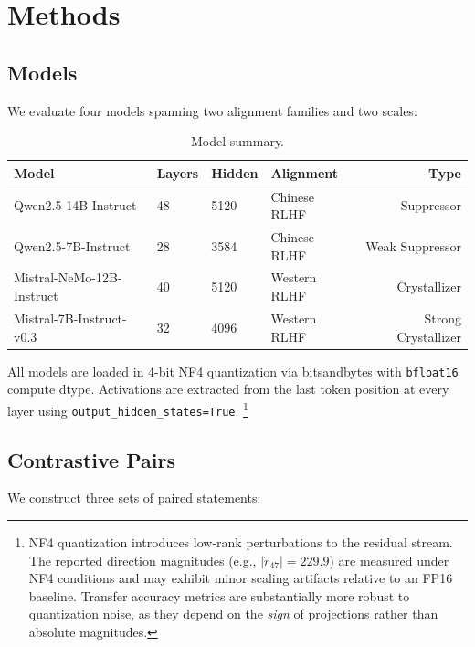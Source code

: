 \documentclass[12pt]{article}
\theoremstyle{definition}
\begin{document}
\section{Methods}
\label{sec:methods}

\subsection{Models}
\label{sec:models}

We evaluate four models spanning two alignment families and two scales:

\begin{table}[h]
\centering
\caption{Model summary.}
\label{tab:models}
\begin{tabular}{llllr}
\toprule
\textbf{Model} & \textbf{Layers} & \textbf{Hidden} & \textbf{Alignment} & \textbf{Type} \\
\midrule
Qwen2.5-14B-Instruct  & 48 & 5120 & Chinese RLHF & Suppressor \\
Qwen2.5-7B-Instruct   & 28 & 3584 & Chinese RLHF & Weak Suppressor \\
Mistral-NeMo-12B-Instruct & 40 & 5120 & Western RLHF & Crystallizer \\
Mistral-7B-Instruct-v0.3  & 32 & 4096 & Western RLHF & Strong Crystallizer \\
\bottomrule
\end{tabular}
\end{table}

All models are loaded in 4-bit NF4 quantization via bitsandbytes \citep{dettmers2022gptint8}
with \texttt{bfloat16} compute dtype. Activations are extracted from the last token position
at every layer using \texttt{output\_hidden\_states=True}.
\footnote{NF4 quantization introduces low-rank perturbations to the residual stream.
The reported direction magnitudes (e.g., $|\hat{r}_{47}| = 229.9$) are measured under
NF4 conditions and may exhibit minor scaling artifacts relative to an FP16 baseline.
Transfer accuracy metrics are substantially more robust to quantization noise, as they
depend on the \emph{sign} of projections rather than absolute magnitudes.}

\subsection{Contrastive Pairs}
\label{sec:pairs}

We construct three sets of paired statements:
\end{document}
